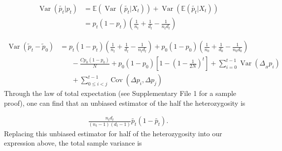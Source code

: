 \documentclass[11pt]{article}
\newcommand{\E}{\mathbb{E}}
\DeclareMathOperator{\var}{Var}
\DeclareMathOperator{\cov}{Cov}
\begin{document}
\begin{align}
  \var(\widetilde{p_t}|p_t) &= \E(\var(\widetilde{p_t} | X_t)) + \var(\E(\widetilde{p_t} | X_t)) \\
                            &= p_t(1-p_t) \left(\frac{1}{n_t} + \frac{1}{d_t} - \frac{1}{n_t d_t} \right)
\end{align}


\begin{align}
  \var(\widetilde{p}_t - \widetilde{p}_0) &= 
  p_t(1-p_t) \left(\frac{1}{n_t} + \frac{1}{d_t} - \frac{1}{n_t d_t} \right)  
  + p_0(1-p_0) \left( \frac{1}{n_0} + \frac{1}{d_0} - \frac{1}{n_0 d_0}\right)  \\ & \;\;\;\;\;\;
  - \frac{C p_0(1-p_0)}{N} + p_0(1-p_0) \left[1 - \left(1-\frac{1}{2N}\right)^t \right]+ \sum_{i=0}^{t-1} \var(\Delta_{_H} p_i)  \\ & \;\;\;\;\;\; + \sum_{0 \le i < j}^{t-1} \cov(\Delta p_i, \Delta p_j) 
\end{align}
%
Through the law of total expectation (see \cite{Kolaczkowski2011-ee}
Supplementary File 1 for a sample proof), one can find that an unbiased
estimator of the half the heterozygosity is 

\begin{align}
  \frac{n_t d_t}{(n_t-1) (d_t-1)} \widetilde{p_t}(1-\widetilde{p_t}).
\end{align}
%
Replacing this unbiased estimator for half of the heterozygosity into our
expression above, the total sample variance is
\end{document}
